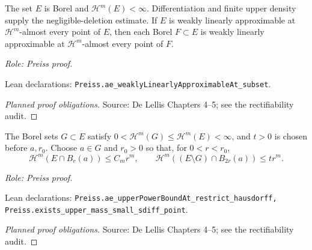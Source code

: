 \begin{lemma}
\label{lem:weak-approximation-restrict-ae}







The set \(E\) is Borel and \(\mathcal H^m(E)<\infty\). Differentiation and finite upper density supply the negligible-deletion estimate.
If \(E\) is weakly linearly approximable at \(\mathcal H^m\)-almost every point of \(E\), then each Borel \(F\subset E\) is weakly linearly approximable at \(\mathcal H^m\)-almost every point of \(F\).
\par\emph{Role: Preiss proof.}
\par Lean declarations: \texttt{Preiss.ae\_weaklyLinearlyApproximableAt\_subset}.
\end{lemma}
\begin{proof}[Planned proof obligations]

\par Source: De Lellis Chapters 4--5; see the rectifiability audit.
\end{proof}

\begin{lemma}
\label{lem:packing-base-point}







The Borel sets \(G\subset E\) satisfy \(0<\mathcal H^m(G)\leq\mathcal H^m(E)<\infty\), and \(t>0\) is chosen before \(a,r_0\).
Choose \(a\in G\) and \(r_0>0\) so that, for \(0<r<r_0\),
\[
 \mathcal H^m(E\cap B_r(a))\leq C_m r^m,\qquad
 \mathcal H^m((E\setminus G)\cap B_{2r}(a))\leq t r^m.
\]
\par\emph{Role: Preiss proof.}
\par Lean declarations: \texttt{Preiss.ae\_upperPowerBoundAt\_restrict\_hausdorff, Preiss.exists\_upper\_mass\_small\_sdiff\_point}.
\end{lemma}
\begin{proof}[Planned proof obligations]

\par Source: De Lellis Chapters 4--5; see the rectifiability audit.
\end{proof}

